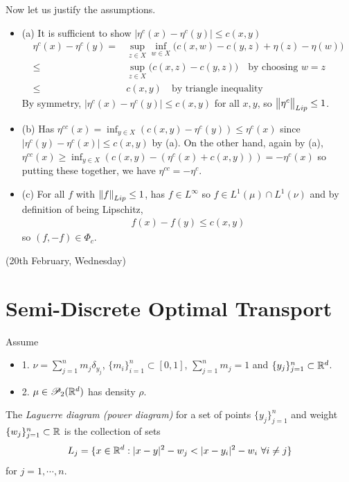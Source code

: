 \documentclass[12pt,a4paper]{article}
\newenvironment{proof}
{\begin{changemargin}{1cm}{0.5cm} 
	}%
	{\end{changemargin}
}
\renewenvironment{i}
{\begin{itemize} 
	}%
	{\end{itemize}
}
\newenvironment{p}
{\begin{proof} 
	}%
	{\end{proof}
}
\begin{document}
\begin{p}
Now let us justify the assumptions.
\begin{i}
\item[(a)] It is sufficient to show $|\eta^c(x) - \eta^c(y)| \leq c(x,y)$
\begin{align*}
\eta^c (x) - \eta^c(y) =& \sup_{z\in X} \inf_{w\in X}\big( c(x,w) - c(y, z) + \eta(z) - \eta(w) \big) \\
\leq& \sup_{z\in X} \big( c(x,z) - c(y,z) \big) \quad \text{by choosing } w=z \\
\leq& c(x,y) \quad \text{by triangle inequality}  
\end{align*}
By symmetry, $|\eta^c (x) - \eta^c(y)| \leq c(x,y)$ for all $x,y$, so $\bigl\lVert\eta^c\bigr\rVert_{Lip} \leq 1$.
\item[(b)] Has $\eta^{cc}(x) = \inf_{y\in X}(c(x,y) - \eta^c(y)) \leq \eta^c(x)$ since $|\eta^c(y) - \eta^c(x)| \leq c(x,y)$ by (a). On the other hand, again by (a), $\eta^{cc}(x) \geq \inf_{y\in X} (c(x,y) - (\eta^c(x) + c(x,y))) = -\eta^c(x)$ so putting these together, we have $\eta^{cc} = -\eta^c$.
\item[(c)] For all $f$ with $\snorms{f}{Lip}\leq1$, has $f\in L^{\infty}$ so $f\in L^1(\mu) \cap L^1(\nu)$ and by definition of being Lipschitz, 
\begin{align*}
f(x) - f(y) \leq c(x,y)
\end{align*}
so $(f, -f) \in \Phi_c$.
\end{i}

\eop
\end{p}

\newday

(20th February, Wednesday)


\section{Semi-Discrete Optimal Transport}

Assume
\begin{i}
\item[1.] $\nu = \sum_{j=1}^n m_{j} \delta_{y_j}$, $\{m_i\}_{i=1}^n \subset [0,1]$, $\sum_{j=1}^n m_j =1$ and $\{y_j \}_{j=1}^n \subset \mathbb{R}^d$.
\item[2.] $\mu \in \mathscr{P}_2(\mathbb{R}^d)$ has density $\rho$.  
\end{i}
\s

 The \emph{Laguerre diagram (power diagram)} for a set of points $\{y_j\}_{j=1}^n$ and weight $\{w_j\}_{j=1}^n\subset \mathbb{R}$ is the collection of sets
\begin{align*}
L_j = \{x\in \mathbb{R}^d : |x-y|^2 - w_j < |x-y_i|^2 - w_i \,\, \forall i\neq j\}
\end{align*}
for $j=1, \cdots, n$.
\s
\end{document}
